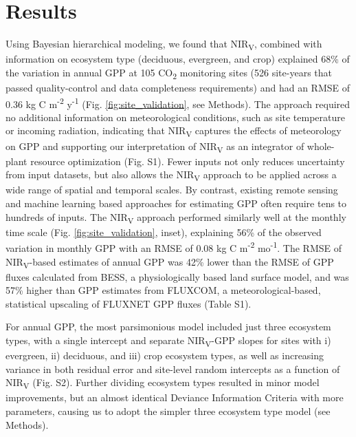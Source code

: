 \documentclass[10pt,letterpaper]{article}
\begin{document}
\section*{Results}
Using Bayesian hierarchical modeling, we found that NIR\textsubscript{V}, combined with information on ecosystem type (deciduous, evergreen, and crop) explained 68\% of the variation in annual GPP at 105 CO\textsubscript{2} monitoring sites (526 site-years that passed quality-control and data completeness requirements) and had an RMSE of 0.36 kg C m\textsuperscript{-2} y\textsuperscript{-1} (Fig. \ref{fig:site_validation}, see Methods). The approach required no additional information on meteorological conditions, such as site temperature or incoming radiation, indicating that NIR\textsubscript{V} captures the effects of meteorology on GPP and supporting our interpretation of NIR\textsubscript{V} as an integrator of whole-plant resource optimization (Fig. S1). Fewer inputs not only reduces uncertainty from input datasets, but also allows the NIR\textsubscript{V} approach to be applied across a wide range of spatial and temporal scales. By contrast, existing remote sensing and machine learning based approaches for estimating GPP often require tens to hundreds of inputs.  The NIR\textsubscript{V} approach performed similarly well at the monthly time scale (Fig. \ref{fig:site_validation}, inset), explaining 56\% of the observed variation in monthly GPP with an RMSE of 0.08 kg C m\textsuperscript{-2} mo\textsuperscript{-1}. The RMSE of NIR\textsubscript{V}-based estimates of annual GPP was 42\% lower than the RMSE of GPP fluxes calculated from BESS, a physiologically based land surface model, and was 57\% higher than GPP estimates from  FLUXCOM, a meteorological-based, statistical upscaling of FLUXNET GPP fluxes (Table S1).  

For annual GPP, the most parsimonious model included just three ecosystem types, with a single intercept and separate NIR\textsubscript{V}-GPP slopes for sites with i) evergreen, ii) deciduous, and iii) crop ecosystem types, as well as increasing variance in both residual error and site-level random intercepts as a function of NIR\textsubscript{V} (Fig. S2). Further dividing ecosystem types resulted in minor model improvements, but an almost identical Deviance Information Criteria with more parameters, causing us to adopt the simpler three ecosystem type model (see Methods). 
\end{document}
